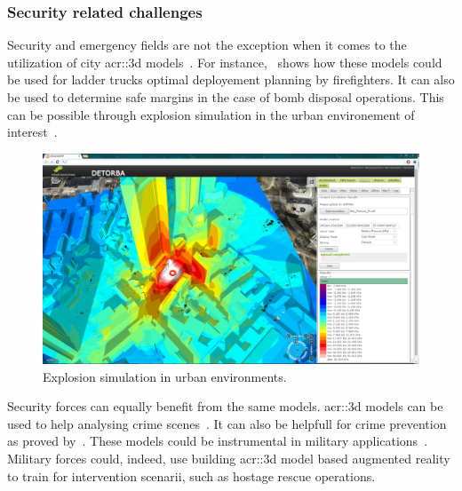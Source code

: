         \subsubsection{Security related challenges}
            Security and emergency fields are not the exception when it comes to the utilization of city \gls{acr::3d} models~\parencite{kwan2005emergency, ruppel2011designing}.
            For instance,~\textcite{chen2014application} shows how these models could be used for ladder trucks optimal deployement planning by firefighters.
            It can also be used to determine safe margins in the case of bomb disposal operations.
            This can be possible through explosion simulation in the urban environement of interest~\parencite{willenborg2015simulation}.\\
            \begin{figure}[htpb]
                \centering
                \includegraphics[width=\textwidth]{images/introduction/3d_model_applications/explosion_simulation}            
                \caption{
                    \label{fig::explosion_simulation} Explosion simulation in urban environments.
                }
            \end{figure}
            Security forces can equally benefit from the same models.
            \gls{acr::3d} models can be used to help analysing crime scenes~\parencite{wolff2009towards}.
            It can also be helpfull for crime prevention as proved by~\textcite{wolff2008geospatial}.
            These models could be instrumental in military applications~\textcite{zlatanova2002trends, budroni2010automatic}.
            Military forces could, indeed, use building \gls{acr::3d} model based augmented reality to train for intervention scenarii, such as hostage rescue operations.

